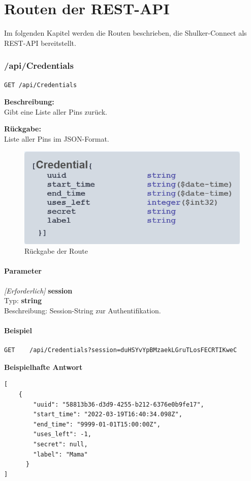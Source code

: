 \lstset{language=json}
\chapter{Routen der REST-API}
Im folgenden Kapitel werden die Routen beschrieben, die Shulker-Connect als REST-API bereitstellt.

\subsection{/api/Credentials}
\begin{lstlisting}
GET /api/Credentials
\end{lstlisting}

\textbf{Beschreibung:} \\
Gibt eine Liste aller Pins zurück.

\textbf{Rückgabe:} \\
Liste aller Pins im JSON-Format.

\begin{figure}[H]
    \begin{center}
        \includegraphics[width=.5\textwidth]{images/connect/routes/Credentials.png}
        \caption{Rückgabe der Route}
    \end{center}
\end{figure}

\subsubsection{Parameter}
\textit{[Erforderlich]} \textbf{session} \\
Typ: \textbf{string} \\
Beschreibung: Session-String zur Authentifikation.

\subsubsection{Beispiel}
\begin{lstlisting}
GET    /api/Credentials?session=duHSYvYpBMzaekLGruTLosFECRTIKweC
\end{lstlisting}
\pagebreak
\textbf{Beispielhafte Antwort} \\
\begin{lstlisting}
[
    {
        "uuid": "58813b36-d3d9-4255-b212-6376e0b9fe17",
        "start_time": "2022-03-19T16:40:34.098Z",
        "end_time": "9999-01-01T15:00:00Z",
        "uses_left": -1,
        "secret": null,
        "label": "Mama"
      }
]
\end{lstlisting}







